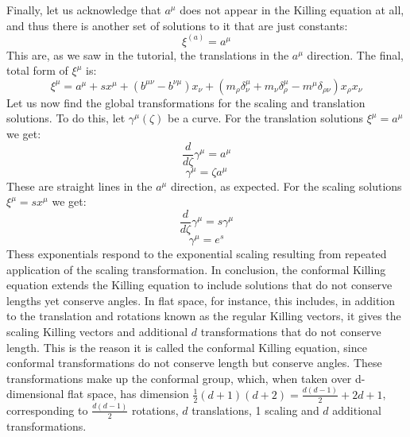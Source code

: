 \documentclass{article}
\begin{document}
\newline
Finally, let us acknowledge that $a^\mu$ does not appear in the Killing equation at all, and thus there is another set of solutions to it that are just constants:
\begin{equation}
    \xi^{(a)} = a^\mu
\end{equation}
This are, as we saw in the tutorial, the translations in the $a^\mu$ direction.
\newline
The final, total form of $\xi^\mu$ is:
\begin{equation}
    \xi^\mu = a^\mu + s x^\mu + \left(b^{\mu\nu} - b^{\nu\mu}\right)x_\nu + \left(m_{\rho}\delta^\mu_{\nu} +
    m_\nu \delta^\mu_{\rho} -
    m^\mu \delta_{\rho\nu}\right)x_\rho x_\nu
\end{equation}
Let us now find the global transformations for the scaling and translation solutions. To do this, let $\gamma^\mu(\zeta)$ be a curve. For the translation solutions $\xi^\mu = a^\mu$ we get:
\begin{equation}
    \frac{d}{d\zeta}\gamma^\mu = a^\mu
\end{equation}
\begin{equation}
    \gamma^\mu = \zeta a^\mu
\end{equation}
These are straight lines in the $a^\mu$ direction, as expected. For the scaling solutions $\xi^\mu = s x^\mu$ we get:
\begin{equation}
    \frac{d}{d\zeta}\gamma^\mu = s \gamma^\mu
\end{equation}
\begin{equation}
    \gamma^\mu = e^s
\end{equation}
Thess exponentials respond to the exponential scaling resulting from repeated application of the scaling transformation.
\newline
\newline
In conclusion, the conformal Killing equation extends the Killing equation to include solutions that do not conserve lengths yet conserve angles. In flat space, for instance, this includes, in addition to the translation and rotations known as the regular Killing vectors, it gives the scaling Killing vectors and additional $d$ transformations that do not conserve length.
\newline
This is the reason it is called the conformal Killing equation, since conformal transformations do not conserve length but conserve angles. These transformations make up the conformal group, which, when taken over d-dimensional flat space, has dimension $\frac{1}{2}(d+1)(d+2) = \frac{d(d-1)}{2} + 2d + 1$, corresponding to $\frac{d(d-1)}{2}$ rotations, $d$ translations, 1 scaling and $d$ additional transformations.
\end{document}
